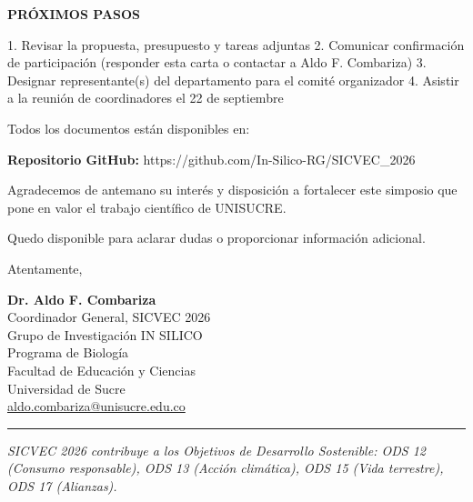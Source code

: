 \documentclass[12pt,a4paper]{article}
\begin{document}
\vspace{0.4cm}

\noindent
\textbf{PRÓXIMOS PASOS}

1. Revisar la propuesta, presupuesto y tareas adjuntas
2. Comunicar confirmación de participación (responder esta carta o contactar a Aldo F. Combariza)
3. Designar representante(s) del departamento para el comité organizador
4. Asistir a la reunión de coordinadores el 22 de septiembre

\vspace{0.4cm}

Todos los documentos están disponibles en:

\noindent
\textbf{Repositorio GitHub:} https://github.com/In-Silico-RG/SICVEC\_2026

\vspace{0.4cm}

Agradecemos de antemano su interés y disposición a fortalecer este simposio que pone en valor el trabajo científico de UNISUCRE.

\vspace{0.4cm}

Quedo disponible para aclarar dudas o proporcionar información adicional.

\vspace{2cm}

Atentamente,

\vspace{2cm}

\textbf{Dr. Aldo F. Combariza}\\
Coordinador General, SICVEC 2026\\
Grupo de Investigación IN SILICO\\
Programa de Biología\\
Facultad de Educación y Ciencias\\
Universidad de Sucre\\
\href{mailto:aldo.combariza@unisucre.edu.co}{aldo.combariza@unisucre.edu.co}

\vspace{0.4cm}

\noindent
\rule{\textwidth}{0.5pt}

\vspace{0.5cm}

\noindent
\textit{\small SICVEC 2026 contribuye a los Objetivos de Desarrollo Sostenible: ODS 12 (Consumo responsable), ODS 13 (Acción climática), ODS 15 (Vida terrestre), ODS 17 (Alianzas).}
\end{document}

